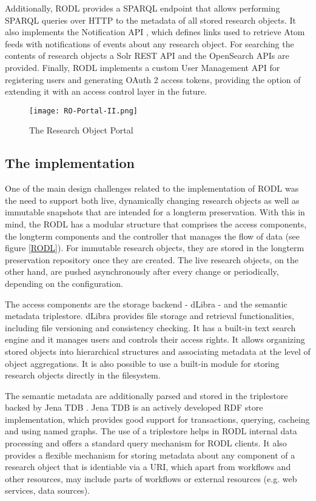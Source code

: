 Additionally, RODL provides a SPARQL endpoint that allows performing SPARQL queries over HTTP to the metadata of all stored research objects. It also implements the Notification API \cite{Notification-API}, which defines links used to retrieve Atom feeds with notifications of events about any research object. For searching the contents of research objects a Solr REST API and the OpenSearch APIs are provided. Finally, RODL implements a custom User Management API \cite{UM-API} for registering users and generating OAuth 2 access tokens, providing the option of extending it with an access control layer in the future.

\begin{figure*}[!hb]
\centering
\texttt{[image: RO-Portal-II.png]}
\caption{The Research Object Portal}
\label{Portal}
\end{figure*}


\subsection{The implementation}

One of the main design challenges related to the implementation of RODL was the need to support both live, dynamically changing research objects as well as immutable snapshots that are intended for a longterm preservation. With this in mind, the RODL has a modular structure that comprises the access components, the longterm components and the controller that manages the flow of data (see figure \ref{RODL}). For immutable research objects, they are stored in the longterm preservation repository once they are created. The live research objects, on the other hand, are pushed asynchronously after every change or periodically, depending on the configuration.

The access components are the storage backend - dLibra \cite{dLibra} - and the semantic metadata triplestore. dLibra provides file storage and retrieval functionalities, including file versioning and consistency checking. It has a built-in text search engine and it manages users and controls their access rights. It allows organizing stored objects into hierarchical structures and associating metadata at the level of object aggregations. It is also possible to use a built-in module for storing research objects directly in the filesystem.

The semantic metadata are additionally parsed and stored in the triplestore backed by Jena TDB \cite{Jena}. Jena TDB is an actively developed RDF store implementation, which provides good support for transactions, querying, cacheing and using named graphs. The use of a triplestore helps in RODL internal data processing and offers a standard query mechanism for RODL clients. It also provides a flexible mechanism for storing metadata about any component of a research object that is identiable via a URI, which apart from workflows and other resources, may include parts of workflows or external resources (e.g. web services, data sources).

